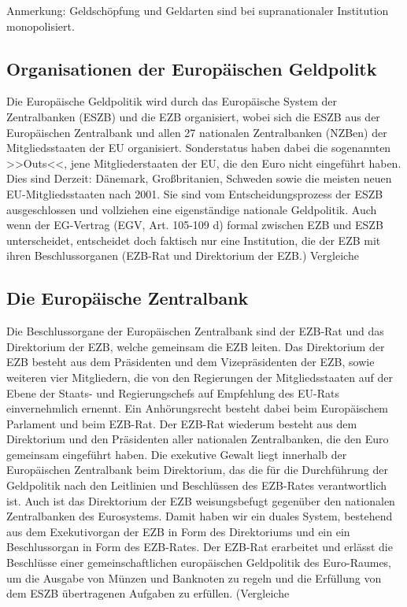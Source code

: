 
Anmerkung: Geldschöpfung und Geldarten sind bei supranationaler Institution monopolisiert.



\subsection{Organisationen der Europ{\"a}ischen Geldpolitk}

Die Europ{\"a}ische Geldpolitik wird durch das Europ{\"a}ische System der Zentralbanken (ESZB) und die EZB organisiert, wobei sich die ESZB aus der Europ{\"a}ischen Zentralbank und allen 27 nationalen Zentralbanken (NZBen) der Mitgliedsstaaten der EU organisiert.
Sonderstatus haben dabei die sogenannten >>Outs<<, jene Mitgliederstaaten der EU, die den Euro  nicht eingef{\"u}hrt haben. Dies sind Derzeit: D{\"a}nemark, Großbritanien, Schweden sowie die meisten neuen EU-Mitgliedsstaaten nach 2001. Sie sind vom Entscheidungsprozess der ESZB ausgeschlossen und vollziehen eine eigenst{\"a}ndige nationale Geldpolitik.
Auch wenn der EG-Vertrag (EGV, Art. 105-109 d) formal zwischen EZB und ESZB unterscheidet, entscheidet doch faktisch nur eine Institution, die der EZB mit ihren Beschlussorganen (EZB-Rat und Direktorium der EZB.) Vergleiche  %

\subsection{Die Europ{\"a}ische Zentralbank}
Die Beschlussorgane der Europ{\"a}ischen Zentralbank sind der EZB-Rat und das Direktorium der EZB, welche gemeinsam die EZB leiten. Das Direktorium der EZB besteht aus dem Pr{\"a}sidenten und dem Vizepr{\"a}sidenten der EZB, sowie weiteren vier Mitgliedern, die von den Regierungen der Mitgliedsstaaten auf der Ebene der Staats- und Regierungschefs auf Empfehlung des EU-Rats einvernehmlich ernennt. Ein Anh{\"o}rungsrecht besteht dabei beim Europ{\"a}ischem Parlament und beim EZB-Rat.
Der EZB-Rat wiederum besteht aus dem Direktorium und den Pr{\"a}sidenten aller nationalen Zentralbanken, die den Euro gemeinsam eingef{\"u}hrt haben.
Die exekutive Gewalt liegt innerhalb der Europ{\"a}ischen Zentralbank beim Direktorium, das die f{\"u}r die Durchf{\"u}hrung der Geldpolitik nach den Leitlinien und Beschl{\"u}ssen des EZB-Rates verantwortlich ist. Auch ist das Direktorium der EZB weisungsbefugt gegen{\"u}ber den nationalen Zentralbanken des Eurosystems.  Damit haben wir ein duales System, bestehend aus dem Exekutivorgan der EZB in Form des Direktoriums und ein ein Beschlussorgan in Form des EZB-Rates.
Der EZB-Rat erarbeitet und erl{\"a}sst die Beschl{\"u}sse einer gemeinschaftlichen europ{\"a}ischen Geldpolitik des Euro-Raumes, um die Ausgabe von M{\"u}nzen und Banknoten zu regeln und die Erf{\"u}llung von dem ESZB {\"u}bertragenen Aufgaben zu erf{\"u}llen.  (Vergleiche  %


